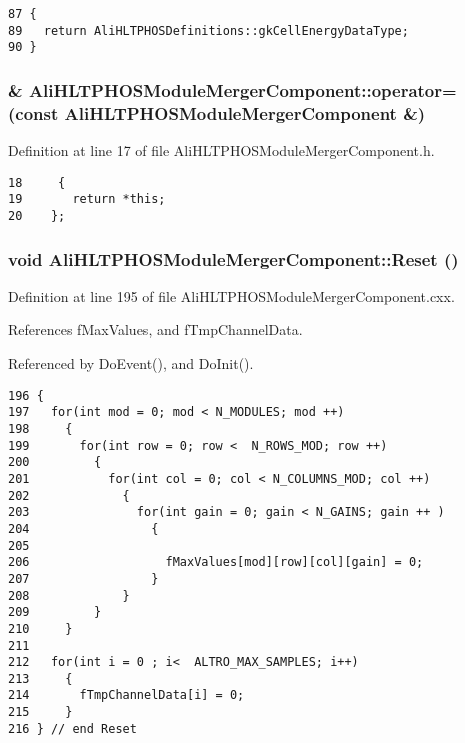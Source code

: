\footnotesize\begin{verbatim}87 {
89   return AliHLTPHOSDefinitions::gkCellEnergyDataType;
90 }
\end{verbatim}\normalsize 


\subsubsection{\& Ali\-HLTPHOSModule\-Merger\-Component::operator= (const {\bf Ali\-HLTPHOSModule\-Merger\-Component} \&)\hspace{0.3cm}{\tt  [inline]}}\label{classAliHLTPHOSModuleMergerComponent_a3}




Definition at line 17 of file Ali\-HLTPHOSModule\-Merger\-Component.h.

\footnotesize\begin{verbatim}18     {
19       return *this;
20    };
\end{verbatim}\normalsize 


\subsubsection{\setlength{\rightskip}{0pt plus 5cm}void Ali\-HLTPHOSModule\-Merger\-Component::Reset ()\hspace{0.3cm}{\tt  [protected]}}\label{classAliHLTPHOSModuleMergerComponent_b0}




Definition at line 195 of file Ali\-HLTPHOSModule\-Merger\-Component.cxx.

References f\-Max\-Values, and f\-Tmp\-Channel\-Data.

Referenced by Do\-Event(), and Do\-Init().

\footnotesize\begin{verbatim}196 {
197   for(int mod = 0; mod < N_MODULES; mod ++)
198     {
199       for(int row = 0; row <  N_ROWS_MOD; row ++)
200         {
201           for(int col = 0; col < N_COLUMNS_MOD; col ++)
202             {
203               for(int gain = 0; gain < N_GAINS; gain ++ )
204                 { 
205 
206                   fMaxValues[mod][row][col][gain] = 0;
207                 }
208             }
209         }
210     }
211 
212   for(int i = 0 ; i<  ALTRO_MAX_SAMPLES; i++)
213     {
214       fTmpChannelData[i] = 0;
215     }
216 } // end Reset
\end{verbatim}\normalsize 


